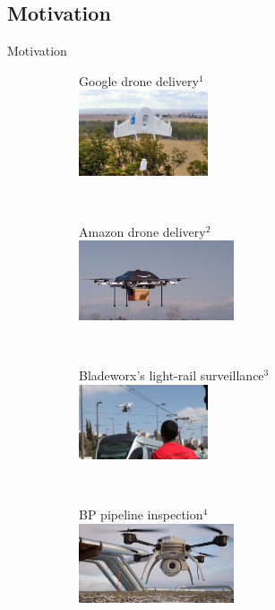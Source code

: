 \documentclass[english]{beamer}
\begin{document}
\subsection{Motivation}

\begin{frame}{Motivation}
%
%
\begin{figure}[!hbtp]
\centering
    \begin{subfigure}[c]{0.4\textwidth}
    {\scriptsize Google drone delivery$^1$} \\
    \includegraphics[width=1.5in]{pics/google_drone.jpg}
    \end{subfigure}%
$\quad$
    \begin{subfigure}[c]{0.4\textwidth}
    {\scriptsize Amazon drone delivery$^2$}\\
    \includegraphics[width=1.8in]{pics/amazon_drone.jpg}
    \end{subfigure}
    \\ \vspace{3pt}
    \begin{subfigure}[c]{0.4\textwidth}
    {\scriptsize Bladeworx's light-rail surveillance$^3$} \\
    \includegraphics[width=1.5in]{pics/jerusalem_drone.jpg}
    \end{subfigure}%
$\quad$
    \begin{subfigure}[c]{0.4\textwidth}
    {\scriptsize BP pipeline inspection$^4$}\\
    \includegraphics[width=1.8in]{pics/bp_drone.jpg}
    \end{subfigure}
    \end{figure}
\vfill
\hrulefill %


\end{frame}
\end{document}
